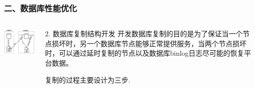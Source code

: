 \documentclass{beamer}
\begin{document}
\begin{frame}
\frametitle{二、数据库性能优化}
  \begin{columns}
    \begin{column}{0.50\textwidth}
      \centering
      \includegraphics[width=5cm]{./img/03/sql.png}
      \label{fig:docker}
    \end{column}
    \begin{column}{0.50\textwidth}
      \begin{block}{2. 数据库复制结构开发}
        开发数据库复制的目的是为了保证当一个节点损坏时，另一个数据库节点能够正常提供服务，当两个节点损坏时，可以通过延时复制的节点以及数据库binlog日志尽可能的恢复平台数据。

        复制的过程主要设计为三步\cite{秦金2013分布式}.
      \end{block}
    \end{column}
  \end{columns}
\end{frame}
\end{document}
